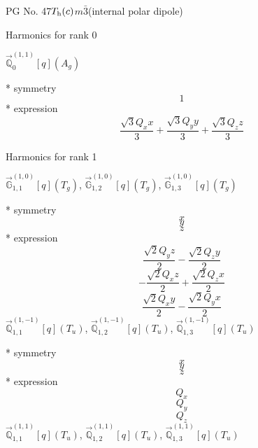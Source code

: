 \documentclass[fleqn,8pt]{jsarticle}
\begin{document}
\setcounter{MaxMatrixCols}{32}

\renewcommand{\tablename}{Table~}
\renewcommand{\figurename}{Figure~}
\begin{center}
\LARGE
PG No. 47\quad$T_{\rm h}(c)$\quad$m\bar{3}$\quad[ cubic ] (internal polar dipole)
\end{center}

\noindent * Harmonics for rank 0

\noindent\quad $\vec{\mathbb{Q}}_{0}^{(1,1)}[q](A_{g})$

\noindent\quad ** symmetry
\begin{dmath*}
1
\end{dmath*}
\noindent\quad ** expression
\begin{dmath*}
\frac{\sqrt{3} Q_{x} x}{3} + \frac{\sqrt{3} Q_{y} y}{3} + \frac{\sqrt{3} Q_{z} z}{3}
\end{dmath*}

\noindent * Harmonics for rank 1

\noindent\quad $\vec{\mathbb{G}}_{1,1}^{(1,0)}[q](T_{g})$, $\vec{\mathbb{G}}_{1,2}^{(1,0)}[q](T_{g})$, $\vec{\mathbb{G}}_{1,3}^{(1,0)}[q](T_{g})$

\noindent\quad ** symmetry
\begin{dmath*}
x
\end{dmath*}
\begin{dmath*}
y
\end{dmath*}
\begin{dmath*}
z
\end{dmath*}
\noindent\quad ** expression
\begin{dmath*}
\frac{\sqrt{2} Q_{y} z}{2} - \frac{\sqrt{2} Q_{z} y}{2}
\end{dmath*}
\begin{dmath*}
- \frac{\sqrt{2} Q_{x} z}{2} + \frac{\sqrt{2} Q_{z} x}{2}
\end{dmath*}
\begin{dmath*}
\frac{\sqrt{2} Q_{x} y}{2} - \frac{\sqrt{2} Q_{y} x}{2}
\end{dmath*}
\noindent\quad $\vec{\mathbb{Q}}_{1,1}^{(1,-1)}[q](T_{u})$, $\vec{\mathbb{Q}}_{1,2}^{(1,-1)}[q](T_{u})$, $\vec{\mathbb{Q}}_{1,3}^{(1,-1)}[q](T_{u})$

\noindent\quad ** symmetry
\begin{dmath*}
x
\end{dmath*}
\begin{dmath*}
y
\end{dmath*}
\begin{dmath*}
z
\end{dmath*}
\noindent\quad ** expression
\begin{dmath*}
Q_{x}
\end{dmath*}
\begin{dmath*}
Q_{y}
\end{dmath*}
\begin{dmath*}
Q_{z}
\end{dmath*}
\noindent\quad $\vec{\mathbb{Q}}_{1,1}^{(1,1)}[q](T_{u})$, $\vec{\mathbb{Q}}_{1,2}^{(1,1)}[q](T_{u})$, $\vec{\mathbb{Q}}_{1,3}^{(1,1)}[q](T_{u})$
\end{document}
